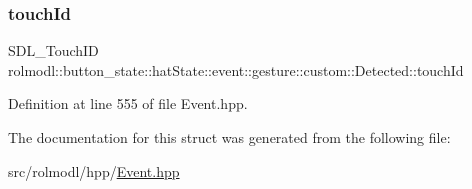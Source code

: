 \subsubsection{\texorpdfstring{touchId}{touchId}}
{\footnotesize\ttfamily S\+D\+L\+\_\+\+Touch\+ID rolmodl\+::button\+\_\+state\+::hat\+State\+::event\+::gesture\+::custom\+::\+Detected\+::touch\+Id}



Definition at line 555 of file Event.\+hpp.



The documentation for this struct was generated from the following file\+:\begin{DoxyCompactItemize}
\item 
src/rolmodl/hpp/\mbox{\hyperlink{_event_8hpp}{Event.\+hpp}}\end{DoxyCompactItemize}
